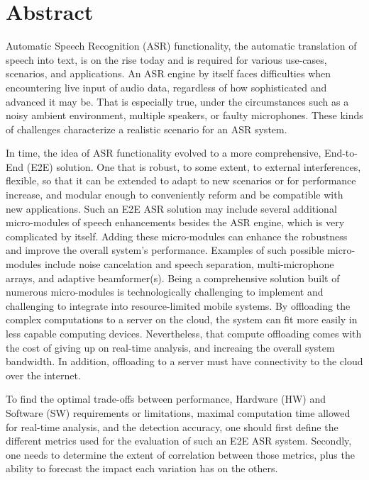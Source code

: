 \chapter*{Abstract}
\vspace*{-1cm}
Automatic Speech Recognition (ASR) functionality,
the automatic translation of
speech into text, 
is on the rise today and is required for 
various use-cases,
scenarios, and applications.
An ASR engine by itself faces difficulties 
when encountering live input of audio data, 
regardless of how sophisticated and advanced it may be.
That is especially true, 
under the circumstances 
such as a noisy ambient environment,
multiple speakers, or faulty microphones.
These kinds of challenges characterize 
a realistic scenario for an ASR system.

In time, the idea of ASR functionality evolved
to a more comprehensive, End-to-End (E2E) solution.
One that is robust, to some extent, to 
external interferences, 
flexible, so that it can be extended 
to adapt to new scenarios or for performance increase,
and modular enough to 
conveniently reform and be compatible 
with new applications.
Such an E2E ASR solution may include 
several additional micro-modules 
of speech enhancements besides the ASR engine, 
which is very complicated by itself. 
Adding these micro-modules can enhance the robustness 
and improve the overall system's performance.
Examples of such possible micro-modules include 
noise cancelation and speech separation, 
multi-microphone arrays, and adaptive beamformer(s).
Being a comprehensive solution built of
numerous micro-modules is technologically 
challenging to implement
and challenging to integrate into resource-limited
mobile systems. 
By offloading the complex computations to a server
on the cloud, 
the system can fit more easily in less capable computing devices. 
Nevertheless, that compute offloading comes with the cost of
giving up on real-time analysis,
and increaing the overall system bandwidth. 
In addition, offloading to a server must have
connectivity to the cloud over the internet.

To find the optimal trade-offs between performance,
Hardware (HW) and Software (SW) 
requirements or limitations, 
maximal computation time 
allowed for real-time analysis,
and the detection accuracy,
one should first define the different metrics 
used for the evaluation 
of such an E2E ASR system.
Secondly, one needs to determine 
the extent of correlation between those 
metrics, plus the ability to forecast the
impact each variation has on the others.

